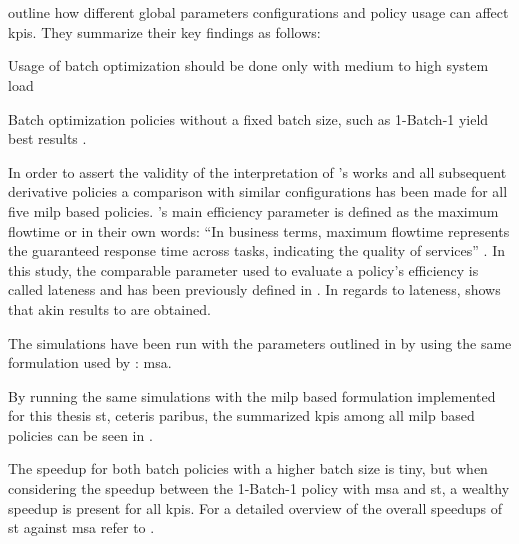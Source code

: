 \section{}
\label{sec:opt_results}

\citet[pp. 18--22]{Zeng2005} outline how different global parameters configurations and policy usage can affect \glspl{kpi}. They summarize their key findings as follows:
\begin{enumerate*}
	\item Usage of batch optimization should be done only with medium to high system load \citep[p. 24]{Zeng2005}
	\item Batch optimization policies without a fixed batch size, such as 1-Batch-1 yield best results \citep[p. 24]{Zeng2005}.
\end{enumerate*}

In order to assert the validity of the interpretation of \citet{Zeng2005}'s works and all subsequent derivative policies a comparison with similar configurations has been made for all five \gls{milp} based policies. \citet{Zeng2005}'s main efficiency parameter is defined as the maximum flowtime or in their own words: ``In business terms, maximum flowtime represents the guaranteed response time across tasks, indicating the quality of services'' \citep[p. 17]{Zeng2005}. In this study, the comparable parameter used to evaluate a policy's efficiency is called lateness and has been previously defined in . In regards to lateness,  shows that akin results to \citet{Zeng2005} are obtained.


The simulations have been run with the parameters outlined in  by using the same formulation used by \citet{Zeng2005}: \gls{msa}.

By running the same simulations with the \gls{milp} based formulation implemented for this thesis \ie \gls{st}, ceteris paribus, the summarized \glspl{kpi} among all \gls{milp} based policies can be seen in .


The speedup for both batch policies with a higher batch size is tiny, but when considering the speedup between the 1-Batch-1 policy with \gls{msa} and \gls{st}, a wealthy speedup is present for all \glspl{kpi}. For a detailed overview of the overall speedups of \gls{st} against \gls{msa} refer to .

